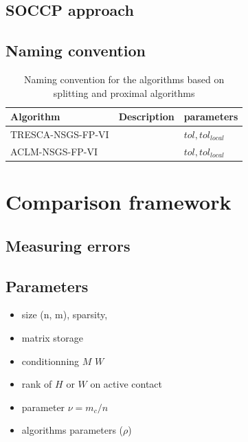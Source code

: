 \subsection{SOCCP approach}


\subsection{Naming convention}

\begin{table}
  \centering
  \begin{tabular}{|l|p{}|l|}
    \hline
    { Algorithm}
    & Description 
    & parameters\\
    \hline
    \sf TRESCA-NSGS-FP-VI
    & 
    & $tol, tol_{local}$\\
    \hline
    \sf ACLM-NSGS-FP-VI
    & 
    & $tol, tol_{local}$\\
    \hline
    \hline
  \end{tabular}
  \caption{Naming convention for the algorithms based on splitting and proximal algorithms}
  \label{tab:PSOR-PPA-algos}
\end{table}


\section{Comparison framework}
\label{sec:numericalcomparisons}
\subsection{Measuring errors}
\label{Sec:MeasuringErrors}

\subsection{Parameters}

\begin{itemize}
\item size (n, m), sparsity,
\item matrix storage
\item conditionning $M$ $W$
\item rank of $H$ or $W$ on active contact
\item parameter $\nu = m_c/n$
\end{itemize}

\begin{itemize}
\item algorithms parameters ($\rho$)
\end{itemize}


